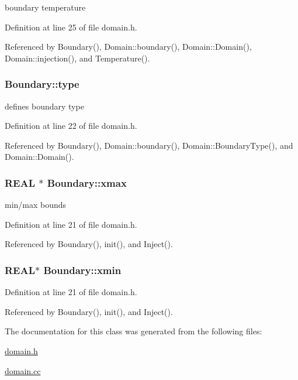 boundary temperature 



Definition at line 25 of file domain.h.

Referenced by Boundary(), Domain::boundary(), Domain::Domain(), Domain::injection(), and Temperature().\hypertarget{structBoundary_5e45eab98ba76e52cf0cdc7518f1d78f}{
\subsubsection[{type}]{ {\bf Boundary::type}}}
\label{structBoundary_5e45eab98ba76e52cf0cdc7518f1d78f}


defines boundary type 



Definition at line 22 of file domain.h.

Referenced by Boundary(), Domain::boundary(), Domain::BoundaryType(), and Domain::Domain().\hypertarget{structBoundary_88c943adaa5964eca320bb392f242ee5}{
\subsubsection[{xmax}]{\setlength{\rightskip}{0pt plus 5cm}REAL $\ast$ {\bf Boundary::xmax}}}
\label{structBoundary_88c943adaa5964eca320bb392f242ee5}


min/max bounds 



Definition at line 21 of file domain.h.

Referenced by Boundary(), init(), and Inject().\hypertarget{structBoundary_fc9c689d9d8f675992fd68f91a4042a3}{
\subsubsection[{xmin}]{\setlength{\rightskip}{0pt plus 5cm}REAL$\ast$ {\bf Boundary::xmin}}}
\label{structBoundary_fc9c689d9d8f675992fd68f91a4042a3}




Definition at line 21 of file domain.h.

Referenced by Boundary(), init(), and Inject().

The documentation for this class was generated from the following files:\begin{CompactItemize}
\item 
\hyperlink{domain_8h}{domain.h}\item 
\hyperlink{domain_8cc}{domain.cc}\end{CompactItemize}
